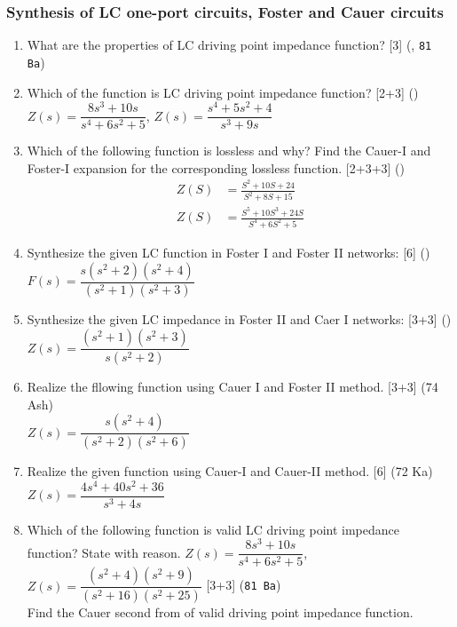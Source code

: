 \documentclass[12pt]{article}
\begin{document}
\subsubsection{Synthesis of LC one-port circuits, Foster and Cauer circuits}
\begin{enumerate}
	\item What are the properties of LC driving point impedance function? \hfill [3] (, \texttt{81 Ba})
	
	\item Which of the function is LC driving point impedance function? \hfill [2+3] ()\\
	$Z(s) = \dfrac{8s^3+10s}{s^4+6s^2+5}$, \hspace{1cm} $Z(s) = \dfrac{s^4+5s^2+4}{s^3+9s}$

	\item Which of the following function is lossless and why? Find the Cauer-I and Foster-I expansion for the corresponding lossless function. \hfill [2+3+3] ()
\begin{align*}
Z(S) &= \frac{S^2+10S+24}{S^2+8S+15}\\
Z(S) &= \frac{S^5+10S^3+24S}{S^4+6S^2+5}
\end{align*}

	\item Synthesize the given LC function in Foster I and Foster II networks: \hfill [6] ()\\
	$F(s) = \dfrac{s(s^2+2)(s^2+4)}{(s^2+1)(s^2+3)}$
	
	\item Synthesize the given LC impedance in Foster II and Caer I networks: \hfill [3+3] ()\\
	$Z(s) = \dfrac{(s^2+1)(s^2+3)}{s(s^2+2)}$
	
	\item Realize the fllowing function using Cauer I and Foster II method. \hfill [3+3] (74 Ash)\\
	$Z(s) = \dfrac{s(s^2+4)}{(s^2+2)(s^2+6)}$
	
	\item Realize the given function using Cauer-I and Cauer-II method. \hfill [6] (72 Ka)\\
	$Z(s) = \dfrac{4s^4+40s^2+36}{s^3+4s}$
	
	\item Which of the following function is valid LC driving point impedance function? State with reason.
$Z(s) = \dfrac{8s^3+10s}{s^4+6s^2+5}$,\hspace*{1cm}    $Z(s) = \dfrac{(s^2+4)(s^2+9)}{(s^2+16)(s^2+25)}$ \hfill [3+3] (\texttt{81 Ba})\\
Find the Cauer second from of valid driving point impedance function.
	

\end{enumerate}
\end{document}
